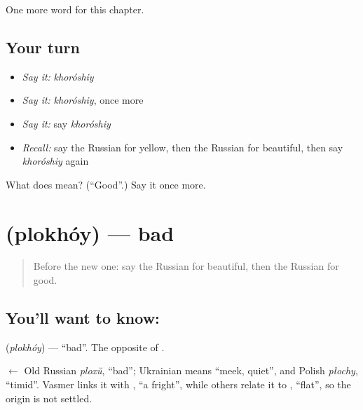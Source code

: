 \begin{grammarlens}[title={What you've built}]
One more word for this chapter.
\end{grammarlens}

\subsection*{Your turn}
\begin{itemize}
\raggedright
  \item \emph{Say it:} \emph{khoróshiy}
  \item \emph{Say it:} \emph{khoróshiy}, once more
  \item \emph{Say it:} say \emph{khoróshiy}
  \item \emph{Recall:} say the Russian for yellow, then the Russian for beautiful, then say \emph{khoróshiy} again
\end{itemize}

\begin{tcolorbox}[breakable,colback=teal!4,colframe=teal!35!black,title={Before you move on}]
What does  mean? (\textquotedblleft{}Good\textquotedblright{}.) Say it once more.
\end{tcolorbox}
\section[\texorpdfstring{\ru{плохой} (plokhóy)}{плохой (plokhóy)}]{ (plokhóy) — bad}

\label{lesson:RU-C64-bad}



\begin{quote}
Before the new one: say the Russian for beautiful, then the Russian for good.
\end{quote}

\subsection*{You'll want to know: }
\textbf{} (\emph{plokhóy}) — \textquotedblleft{}bad\textquotedblright{}. The opposite of \textbf{}.

\begin{cousinweb}
\textbf{} $\leftarrow$ Old Russian \emph{ploxŭ}, \textquotedblleft{}bad\textquotedblright{}; Ukrainian \emph{} means \textquotedblleft{}meek, quiet\textquotedblright{}, and Polish \emph{płochy}, \textquotedblleft{}timid\textquotedblright{}. Vasmer links it with \emph{}, \textquotedblleft{}a fright\textquotedblright{}, while others relate it to \emph{}, \textquotedblleft{}flat\textquotedblright{}, so the origin is not settled.
\end{cousinweb}

